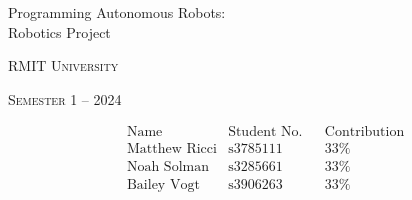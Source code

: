 \documentclass[a4paper, oneside]{memoir}
\newcommand*{\semester}[2]{Semester #1 -- #2} %
\newcommand*{\student}[3]{&\text{#1} &\text{#2} &&\text{#3}} %
\newcommand*{\titleAM}[3]%
{\begingroup
  \centering
  {\Huge #1:\\#2\par}\vspace{\baselineskip} %
  {\small\scshape RMIT University}\par
  {\small\scshape #3}\par\vspace{0.5em}
  \endgroup}
\begin{document}
\titleAM{Programming Autonomous Robots}{Robotics Project}{\semester{1}{2024}}
  \begin{align*}
    &\text{Name} &\text{Student No.} &&\text{Contribution}\\
    \student{Matthew Ricci}{s3785111}{33\%}\\
    \student{Noah Solman}{s3285661}{33\%}\\
    \student{Bailey Vogt}{s3906263}{33\%}
  \end{align*}
  \tableofcontents*
  \clearpage
  \renewcommand{\abstractname}{Summary}

  \markboth{}{}
  
        
  
  


\end{document}
